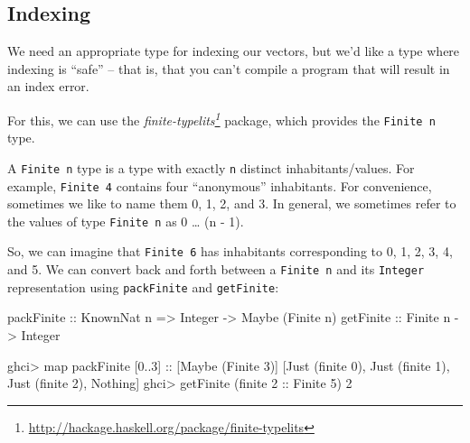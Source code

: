 \documentclass[]{article}
\newenvironment{Shaded}{}{}
\newcommand{\DataTypeTok}[1]{\textcolor[rgb]{0.56,0.13,0.00}{#1}}
\newcommand{\DecValTok}[1]{\textcolor[rgb]{0.25,0.63,0.44}{#1}}
\newcommand{\FunctionTok}[1]{\textcolor[rgb]{0.02,0.16,0.49}{#1}}
\newcommand{\NormalTok}[1]{#1}
\newcommand{\OperatorTok}[1]{\textcolor[rgb]{0.40,0.40,0.40}{#1}}
\newcommand{\OtherTok}[1]{\textcolor[rgb]{0.00,0.44,0.13}{#1}}
\renewcommand{\href}[2]{#2\footnote{\url{#1}}}
\begin{document}
\hypertarget{indexing}{%
\subsection{Indexing}\label{indexing}}

We need an appropriate type for indexing our vectors, but we'd like a type where
indexing is ``safe'' -- that is, that you can't compile a program that will
result in an index error.

For this, we can use the
\emph{\href{http://hackage.haskell.org/package/finite-typelits}{finite-typelits}}
package, which provides the \texttt{Finite\ n} type.

A \texttt{Finite\ n} type is a type with exactly \texttt{n} distinct
inhabitants/values. For example, \texttt{Finite\ 4} contains four ``anonymous''
inhabitants. For convenience, sometimes we like to name them 0, 1, 2, and 3. In
general, we sometimes refer to the values of type \texttt{Finite\ n} as 0
\ldots{} (n - 1).

So, we can imagine that \texttt{Finite\ 6} has inhabitants corresponding to 0,
1, 2, 3, 4, and 5. We can convert back and forth between a \texttt{Finite\ n}
and its \texttt{Integer} representation using \texttt{packFinite} and
\texttt{getFinite}:

\begin{Shaded}
\begin{Highlighting}[]
\OtherTok{packFinite ::} \DataTypeTok{KnownNat}\NormalTok{ n }\OtherTok{=>} \DataTypeTok{Integer}  \OtherTok{{-}>} \DataTypeTok{Maybe}\NormalTok{ (}\DataTypeTok{Finite}\NormalTok{ n)}
\OtherTok{getFinite  ::}               \DataTypeTok{Finite}\NormalTok{ n }\OtherTok{{-}>} \DataTypeTok{Integer}
\end{Highlighting}
\end{Shaded}

\begin{Shaded}
\begin{Highlighting}[]
\NormalTok{ghci}\OperatorTok{>} \FunctionTok{map}\NormalTok{ packFinite [}\DecValTok{0}\OperatorTok{..}\DecValTok{3}\NormalTok{]}\OtherTok{ ::}\NormalTok{ [}\DataTypeTok{Maybe}\NormalTok{ (}\DataTypeTok{Finite} \DecValTok{3}\NormalTok{)]}
\NormalTok{[}\DataTypeTok{Just}\NormalTok{ (finite }\DecValTok{0}\NormalTok{), }\DataTypeTok{Just}\NormalTok{ (finite }\DecValTok{1}\NormalTok{), }\DataTypeTok{Just}\NormalTok{ (finite }\DecValTok{2}\NormalTok{), }\DataTypeTok{Nothing}\NormalTok{]}
\NormalTok{ghci}\OperatorTok{>}\NormalTok{ getFinite (finite }\DecValTok{2}\OtherTok{ ::} \DataTypeTok{Finite} \DecValTok{5}\NormalTok{)}
\DecValTok{2}
\end{Highlighting}
\end{Shaded}
\end{document}
